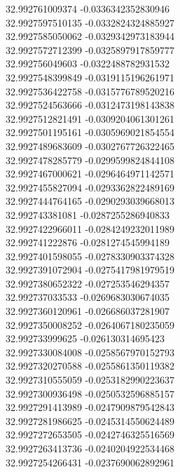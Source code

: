 {32.992761009374	-0.0336342352830946\\
32.9927597510135	-0.0332824324885927\\
32.9927585050062	-0.0329342973183944\\
32.9927572712399	-0.0325897917859777\\
32.992756049603	-0.0322488782931532\\
32.9927548399849	-0.0319115196261971\\
32.9927536422758	-0.0315776789520216\\
32.9927524563666	-0.0312473198143838\\
32.9927512821491	-0.0309204061301261\\
32.9927501195161	-0.0305969021854554\\
32.9927489683609	-0.0302767726322465\\
32.9927478285779	-0.0299599824844108\\
32.9927467000621	-0.0296464971142571\\
32.9927455827094	-0.0293362822489169\\
32.9927444764165	-0.0290293039668013\\
32.992743381081	-0.0287255286940833\\
32.9927422966011	-0.0284249232011989\\
32.992741222876	-0.0281274545994189\\
32.9927401598055	-0.0278330903374328\\
32.9927391072904	-0.0275417981979519\\
32.9927380652322	-0.027253546294357\\
32.992737033533	-0.0269683030674035\\
32.9927360120961	-0.026686037281907\\
32.9927350008252	-0.0264067180235059\\
32.992733999625	-0.026130314695423\\
32.9927330084008	-0.0258567970152793\\
32.9927320270588	-0.0255861350119382\\
32.9927310555059	-0.0253182990223637\\
32.9927300936498	-0.0250532596885157\\
32.9927291413989	-0.0247909879542843\\
32.9927281986625	-0.0245314550624489\\
32.9927272653505	-0.0242746325516569\\
32.9927263413736	-0.0240204922534468\\
32.9927254266431	-0.0237690062892961\\
}
